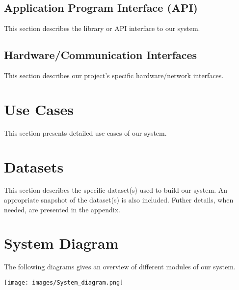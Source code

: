 \subsection{Application Program Interface (API)}
This section describes the library or API interface to our system.

\subsection{Hardware/Communication Interfaces}
This section describes our project's specific hardware/network interfaces.

\section{Use Cases}
This section presents detailed use cases of our system.

\section{Datasets}
This section describes the specific dataset(s) used to build our system. An appropriate snapshot of the dataset(s) is also included. Futher details, when needed, are presented in the appendix.

\section{System Diagram}
The following diagrams gives an overview of different modules of our system.

\texttt{[image: images/System\_diagram.png]}\\
